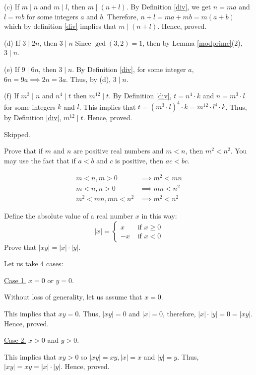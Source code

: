 	(c) If $m \mid n$ and $m \mid l$, then $m \mid (n+l)$.
	\bs
		By Definition \ref{div}, we get $n = ma$ and $l = mb$ for some integers $a$ and $b$.
		Therefore, $n+l = ma + mb = m(a+b)$ which by definition \ref{div} implies that $m \mid (n+l)$. 
		Hence, proved.
	\es

	(d) If $3 \mid 2n$, then $3 \mid n$
	\bs
		Since $\gcd(3,2) = 1$, then by Lemma \ref{modprime}(2), $3 \mid n$.
	\es

	(e) If $9 \mid 6n$, then $3 \mid n$.
	\bs
		By Definition \ref{div}, for some integer $a$, $6n = 9a \implies 2n = 3a$. Thus, by (d), $3 \mid n$.
	\es

	(f) If $m^3 \mid n$ and $n^4 \mid t$ then $m^12 \mid t$.
	\bs
		By Definition \ref{div}, $t = n^4 \cdot k$ and $n = m^3 \cdot l$ for some integers $k$ and $l$. This implies that $t = (m^3 \cdot l)^4 \cdot k = m^12  \cdot l^4 \cdot k$. Thus, by Definition \ref{div}, $m^12 \mid t$. Hence, proved.
	\es

\ep 


\bp Skipped.\ep 

\bp 
	Prove that if $m$ and $n$ are positive real numbers and $m < n$, then $m^2 < n^2$. You may use the fact that if $a < b$ and $c$ is positive, then $ac < bc$.
\ep 

\bs
	\begin{align}
		m < n, m > 0 &\implies m^2 < mn \\
		m < n, n > 0 &\implies mn < n^2 \\
		m^2 < mn, mn < n^2 &\implies m^2 < n^2
	\end{align}
\es

\bp 
	Define the absolute value of a real number $x$ in this way:
	$$ 
	|x| = 
	\begin{cases}
		x &\text{ if } x \geq 0 \\
		-x &\text{ if } x < 0
	\end{cases}
	$$
	Prove that $|xy| = |x| \cdot |y|$.
\ep 

\bs
	Let us take 4 cases:

	\underline{Case 1.} $x = 0$ or $y = 0$. 

	Without loss of generality, let us assume that $x = 0$.

	This implies that $xy = 0$. Thus, $|xy| = 0$ and $|x| = 0$, therefore, $|x|\cdot|y| = 0 = |xy|$. Hence, proved.

	\underline{Case 2.} $x > 0$ and $y > 0$.

	This implies that $xy > 0$ so $|xy| = xy, |x| = x$ and $|y| = y$.
	Thus, $|xy| = xy = |x|\cdot|y|$. Hence, proved.

